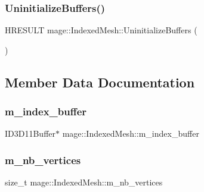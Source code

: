 \hypertarget{classmage_1_1_indexed_mesh_a7188698b2a8104adce23264fa9d9659c}{}\label{classmage_1_1_indexed_mesh_a7188698b2a8104adce23264fa9d9659c} 
\subsubsection{\texorpdfstring{Uninitialize\+Buffers()}{UninitializeBuffers()}}
{\footnotesize\ttfamily H\+R\+E\+S\+U\+LT mage\+::\+Indexed\+Mesh\+::\+Uninitialize\+Buffers (\begin{DoxyParamCaption}{ }\end{DoxyParamCaption})\hspace{0.3cm}{\ttfamily [protected]}}



\subsection{Member Data Documentation}
\hypertarget{classmage_1_1_indexed_mesh_a21178389091c3619291145c2d306b473}{}\label{classmage_1_1_indexed_mesh_a21178389091c3619291145c2d306b473} 
\subsubsection{\texorpdfstring{m\+\_\+index\+\_\+buffer}{m\_index\_buffer}}
{\footnotesize\ttfamily I\+D3\+D11\+Buffer$\ast$ mage\+::\+Indexed\+Mesh\+::m\+\_\+index\+\_\+buffer\hspace{0.3cm}{\ttfamily [protected]}}

\hypertarget{classmage_1_1_indexed_mesh_aa97d660f00cdec3c99b50ea636d49709}{}\label{classmage_1_1_indexed_mesh_aa97d660f00cdec3c99b50ea636d49709} 
\subsubsection{\texorpdfstring{m\+\_\+nb\+\_\+vertices}{m\_nb\_vertices}}
{\footnotesize\ttfamily size\+\_\+t mage\+::\+Indexed\+Mesh\+::m\+\_\+nb\+\_\+vertices\hspace{0.3cm}{\ttfamily [protected]}}

